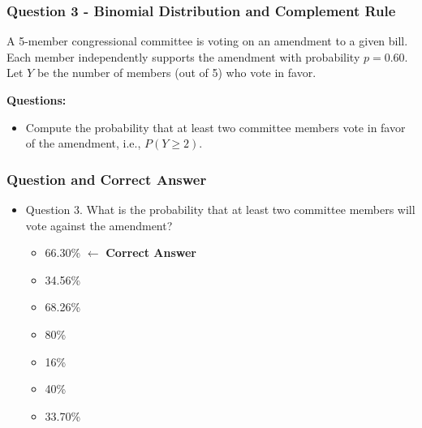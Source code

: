 \documentclass[handout]{beamer} %
\begin{document}
\begin{frame} \frametitle{Question 3 - Binomial Distribution and Complement Rule}
    A 5-member congressional committee is voting on an amendment to a given bill. Each member independently supports the amendment with probability $p = 0.60$. Let $Y$ be the number of members (out of 5) who vote in favor.
    \vspace{2em}
    
    \textbf{Questions:}
    \begin{itemize}
        \item Compute the probability that at least two committee members vote in favor of the amendment, i.e., $P(Y \geq 2)$.
    \end{itemize}
\end{frame}

\begin{frame} \frametitle{Question and Correct Answer}

\begin{itemize}
    \item Question 3. What is the probability that at least two committee members will vote against the amendment?
    \begin{itemize}
        \item 66.30\% $\leftarrow$ \textbf{Correct Answer}
        \item 34.56\%
        \item 68.26\%
        \item 80\%
        \item 16\%
        \item 40\%
        \item 33.70\%
    \end{itemize}
\end{itemize}

\end{frame} %
\end{document}
